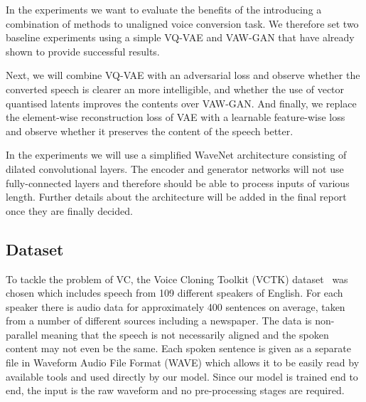 \documentclass{article}
\begin{document}
In the experiments we want to evaluate the benefits of the introducing a combination of methods to unaligned voice conversion task. We therefore set two baseline experiments using a simple VQ-VAE and VAW-GAN that have already shown to provide successful results.

Next, we will combine VQ-VAE with an adversarial loss and observe whether the converted speech is clearer an more intelligible, and whether the use of vector quantised latents improves the contents over VAW-GAN.
And finally, we replace the element-wise reconstruction loss of VAE with a learnable feature-wise loss and observe whether it preserves the content of the speech better.

In the experiments we will use a simplified WaveNet architecture \cite{Oord2016} consisting of dilated convolutional layers. The encoder and generator networks will not use fully-connected layers and therefore should be able to process inputs of various length. Further details about the architecture will be added in the final report once they are finally decided.

\subsection{Dataset} 
\label{sec:experiments:dataset}

To tackle the problem of VC, the Voice Cloning Toolkit (VCTK) dataset~\cite{yamagishi_english_2012} was chosen which includes speech from 109 different speakers of English. For each speaker there is audio data for approximately 400 sentences on average, taken from a number of different sources including a newspaper. The data is non-parallel meaning that the speech is not necessarily aligned and the spoken content may not even be the same. Each spoken sentence is given as a separate file in Waveform Audio File Format (WAVE) which allows it to be easily read by available tools and used directly by our model. Since our model is trained end to end, the input is the raw waveform and no pre-processing stages are required.
\end{document}
